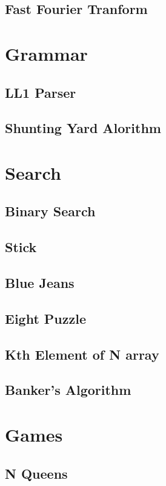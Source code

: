 \documentclass{article}
\begin{document}
    \subsection{Fast Fourier Tranform}
        

\section{Grammar}
    \subsection{LL1 Parser}
        
    \subsection{Shunting Yard Alorithm}

\section{Search}
    \subsection{Binary Search}
        
    \subsection{Stick}
    \subsection{Blue Jeans}
    \subsection{Eight Puzzle}
    \subsection{Kth Element of N array}
    \subsection{Banker's Algorithm}
        

\section{Games}
    \subsection{N Queens}
\end{document}
